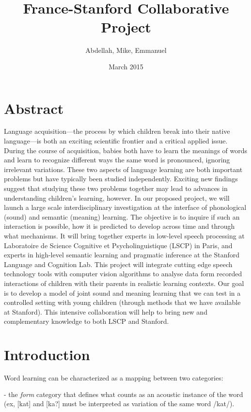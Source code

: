 \documentclass[12pt]{article}
\title{France-Stanford Collaborative Project}
\author{Abdellah, Mike, Emmanuel}
\date{March 2015}
\begin{document}
\maketitle

\section*{Abstract}

Language acquisition---the process by which children break into their native language---is both an exciting scientific frontier and a critical applied issue. During the course of acquisition, babies both have to learn the meanings of words and learn to recognize different ways the same word is pronounced, ignoring irrelevant variations. These two aspects of language learning are both important problems but have typically been studied independently. Exciting new findings suggest that studying these two problems together may lead to advances in understanding children's learning, however. In our proposed project, we will launch a large scale interdisciplinary investigation at the interface of phonological (sound) and semantic (meaning) learning. The objective is to inquire if such an interaction is possible, how it is predicted to develop across time and through what mechanisms. It will bring together experts in low-level speech processing at Laboratoire de Science Cognitive et Psycholinguistique (LSCP) in Paris, and experts in high-level semantic learning and pragmatic inference at the Stanford Language and Cognition Lab. This project will integrate cutting edge speech technology tools with computer vision algorithms to analyse data form recorded interactions of children with their parents in realistic learning contexts. Our goal is to develop a model of joint sound and meaning learning that we can test in a controlled setting with young children (through methods that we have available at Stanford). This intensive collaboration will help to bring new and complementary knowledge to both LSCP and Stanford.

\section*{Introduction}

Word learning can be characterized as  a mapping between two categories:

- the \textit{form} category that defines what counts as an acoustic instance of the word (ex, [kat] and [ka?] must be interpreted as variation of the same word /kat/).
\end{document}
